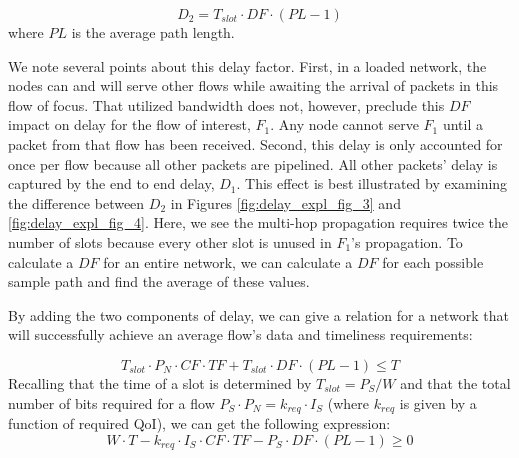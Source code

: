 \begin{equation}
	D_2 = T_{slot} \cdot DF \cdot (PL - 1)
\end{equation}
where $PL$ is the average path length.

We note several points about this delay factor.  First, in a loaded network, the nodes can and will serve other flows while awaiting the arrival of packets in this flow of focus.  That utilized bandwidth does not, however, preclude this $DF$ impact on delay for the flow of interest, $F_1$.  Any node cannot serve $F_1$ until a packet from that flow has been received.  Second, this delay is only accounted for once per flow because all other packets are pipelined.  All other packets' delay is captured by the end to end delay, $D_1$.  This effect is best illustrated by examining the difference between $D_2$ in Figures \ref{fig:delay_expl_fig_3} and \ref{fig:delay_expl_fig_4}.  Here, we see the multi-hop propagation requires twice the number of slots because every other slot is unused in $F_1$'s propagation.  
To calculate a $DF$ for an entire network, we can calculate a $DF$ for each possible sample path and find the average of these values.  %

By adding the two components of delay, we can give a relation for a network that will successfully achieve an average flow's data and timeliness requirements:

\begin{equation*}
	T_{slot} \cdot P_N \cdot CF \cdot TF + T_{slot} \cdot DF \cdot (PL-1) \leq T
\end{equation*}
Recalling that the time of a slot is determined by %
$T_{slot} = P_S/W$ %
and that the total number of bits required for a flow $P_S \cdot P_N =  k_{req} \cdot I_S$ (where $k_{req}$ is given by a function of required QoI), we can get the following expression:
\begin{equation}
	W \cdot T - k_{req} \cdot I_S \cdot CF \cdot TF - P_S \cdot DF \cdot (PL-1) \geq 0	
	\label{eq:general_scal}
\end{equation}

